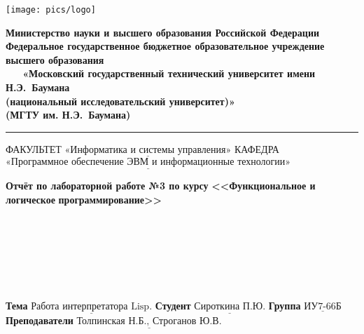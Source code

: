 \documentclass[12pt]{report}
\begin{document}
	
\thispagestyle{empty}
\begin{titlepage}
	\noindent \begin{minipage}{0.15\textwidth}
		\texttt{[image: pics/logo]}
	\end{minipage}
	\noindent\begin{minipage}{0.9\textwidth}\centering
		\textbf{Министерство науки и высшего образования Российской Федерации}\\
		\textbf{Федеральное государственное бюджетное образовательное учреждение высшего образования}\\
		\textbf{~~~«Московский государственный технический университет имени Н.Э.~Баумана}\\
		\textbf{(национальный исследовательский университет)»}\\
		\textbf{(МГТУ им. Н.Э.~Баумана)}
	\end{minipage}
	
	\noindent\rule{18cm}{3pt}
	\newline\newline
	\noindent ФАКУЛЬТЕТ $\underline{\text{«Информатика и системы управления»}}$ \newline\newline
	\noindent КАФЕДРА $\underline{\text{«Программное обеспечение ЭВМ и информационные технологии»}}$\newline\newline\newline\newline\newline
	
	
	\begin{center}
		\noindent\begin{minipage}{1.3\textwidth}\centering
			\Large\textbf{  Отчёт по лабораторной работе №3 по курсу}\newline\newline
			\textbf{<<Функциональное и логическое}\newline
			\textbf{\indent\indent\indent программирование>>}\newline
		\end{minipage}
	\end{center}
	
	~\\\\\\\\\\\\
	\large
	\noindent\textbf{Тема } $\underline{\text{Работа интерпретатора Lisp.}}$\newline\newline
	\noindent\textbf{Студент } $\underline{\text{Сироткина П.Ю.}}$\newline\newline
	\noindent\textbf{Группа } $\underline{\text{ИУ7-66Б}}$\newline\newline
	\noindent\textbf{Преподаватели } $\underline{\text{Толпинская Н.Б., Строганов Ю.В.}}$\newline\newline\newline
	

\end{titlepage}
\end{document}
